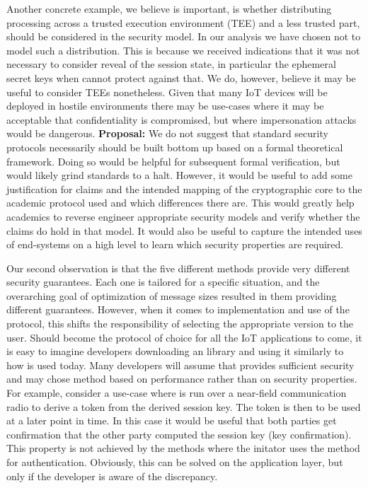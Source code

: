 \documentclass[runningheads]{llncs}
\begin{document}
Another concrete example, we believe is important, is whether distributing
\mEdhoc{} processing across a trusted execution environment (TEE) and a less
trusted part, should be considered in the security model.
%
In our analysis we have chosen not to model such a distribution.
%
This is because we received indications that it was not necessary to consider
reveal of the session state, in particular the ephemeral secret keys when
\mSigma{} cannot protect against that.
%
We do, however, believe it may be useful to consider TEEs nonetheless.
%
Given that many IoT devices will be deployed in hostile environments there may
be use-cases where it may be acceptable that confidentiality is compromised, but
where impersonation attacks would be dangerous.
%
\textbf{Proposal:} We do not suggest that standard security protocols
necessarily should be built bottom up based on a formal theoretical framework.
%
Doing so would be helpful for subsequent formal verification, but would
likely grind standards to a halt.
%
However, it would be useful to add some justification for claims and the
intended mapping of the cryptographic core to the academic protocol used and
which differences there are.
%
This would greatly help academics to reverse engineer appropriate security
models and verify whether the claims do hold in that model.
%
It would also be useful to capture the intended uses of end-systems on a high
level to learn which security properties are required.
%

Our second observation is that the five different methods provide very different
security guarantees.
%
Each one is tailored for a specific situation, and the overarching goal of
optimization of message sizes resulted in them providing different guarantees.
%
However, when it comes to implementation and use of the protocol, this shifts the
responsibility of selecting the appropriate version to the user.
%
Should \mEdhoc become the protocol of choice for all the IoT applications to
come, it is easy to imagine developers downloading an \mEdhoc library and using
it similarly to how \mTls is used today.
%
Many developers will assume that \mEdhoc provides sufficient security and may
chose method based on performance rather than on security properties.
%
For example, consider a use-case where \mEdhoc is run over a near-field
communication radio to derive a token from the derived session key.
%
The token is then to be used at a later point in time.
%
In this case it would be useful that both parties get confirmation that the
other party computed the session key (key confirmation).
%
This property is not achieved by the \mEdhoc methods where the initator uses the
\mStat method for authentication.
%
Obviously, this can be solved on the application layer, but only if the
developer is aware of the discrepancy.
%
\end{document}
